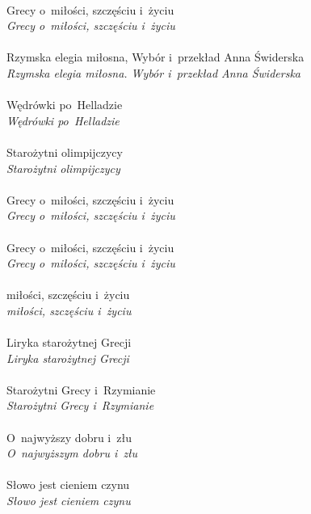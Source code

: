 \documentclass[a4paper,11pt]{article}
\begin{document}
 \\
\Jest  Grecy o~miłości, szczęściu i~życiu \\
\Powin \textit{Grecy o~miłości, szczęściu i~życiu} \\
 \\
\Jest  Rzymska elegia miłosna, Wybór i~przekład Anna Świderska \\
\Powin \textit{Rzymska elegia miłosna. Wybór i~przekład Anna Świderska} \\
 \\
\Jest  Wędrówki po~Helladzie \\
\Powin \textit{Wędrówki po~Helladzie} \\
 \\
\Jest  Starożytni olimpijczycy \\
\Powin \textit{Starożytni olimpijczycy} \\
 \\
\Jest  Grecy o~miłości, szczęściu i~życiu \\
\Powin \textit{Grecy o~miłości, szczęściu i~życiu} \\
 \\
\Jest  Grecy o~miłości, szczęściu i~życiu \\
\Powin \textit{Grecy o~miłości, szczęściu i~życiu} \\
 \\
\Jest  miłości, szczęściu i~życiu \\
\Powin \textit{miłości, szczęściu i~życiu} \\
 \\
\Jest  Liryka starożytnej Grecji \\
\Powin \textit{Liryka starożytnej Grecji} \\
 \\
\Jest  Starożytni Grecy i~Rzymianie \\
\Powin \textit{Starożytni Grecy i~Rzymianie} \\
 \\
\Jest  O~najwyższy dobru i~złu \\
\Powin \textit{O~najwyższym dobru i~złu} \\
 \\
\Jest  Słowo jest cieniem czynu \\
\Powin \textit{Słowo jest cieniem czynu} \\
 \\
\end{document}
